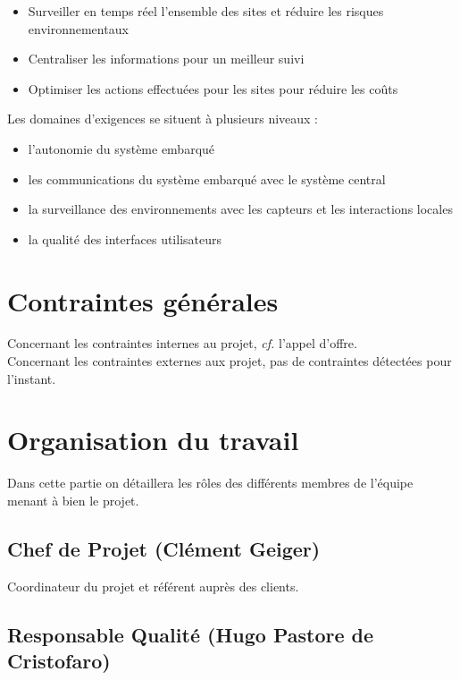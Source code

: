 \documentclass[twoside]{article}
\begin{document}
\begin{itemize}
\item Surveiller en temps réel l'ensemble des sites et réduire les risques environnementaux
\item Centraliser les informations pour un meilleur suivi
\item Optimiser les actions effectuées pour les sites pour réduire les coûts
\end{itemize}

Les domaines d'exigences se situent à plusieurs niveaux : 

\begin{itemize}
\item l'autonomie du système embarqué
\item les communications du système embarqué avec le système central
\item la surveillance des environnements avec les capteurs et les interactions locales
\item la qualité des interfaces utilisateurs
\end{itemize}


\section{Contraintes générales}

Concernant les contraintes internes au projet, \textit{cf.} l'appel d'offre.\\
Concernant les contraintes externes aux projet, pas de contraintes détectées
pour l'instant.

\section{Organisation du travail}

Dans cette partie on détaillera les rôles des différents membres de l'équipe
menant à bien le projet.


\subsection{Chef de Projet (Clément Geiger)}

Coordinateur du projet et référent auprès des clients.


\subsection{Responsable Qualité (Hugo Pastore de Cristofaro)}
\end{document}
